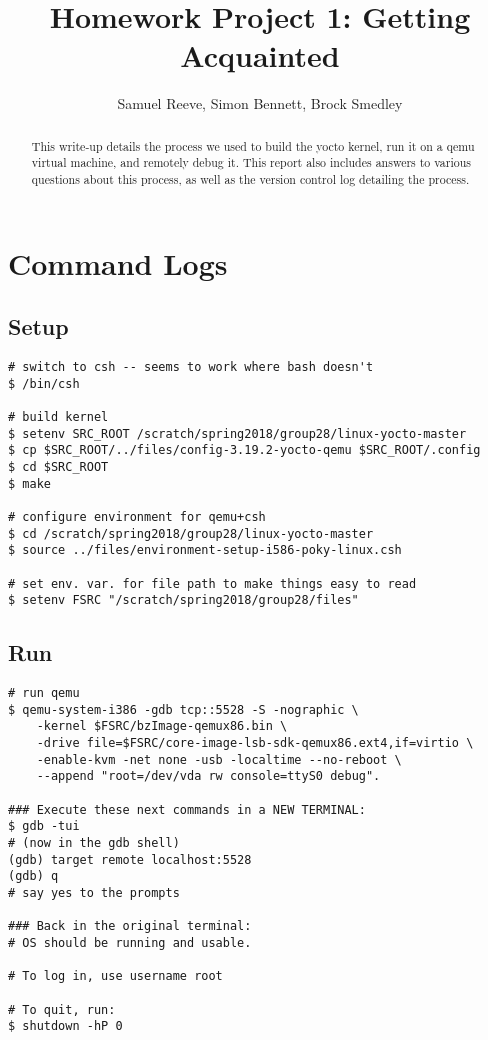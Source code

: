 \documentclass[10pt,a4paper]{report}
\author{Samuel Reeve, Simon Bennett, Brock Smedley}
\title{Homework Project 1: Getting Acquainted}
\begin{document}
	\maketitle
	
	\begin{abstract}
		This write-up details the process we used to build the yocto kernel, run it on a qemu virtual machine, and remotely debug it. This report also includes answers to various questions about this process, as well as the version control log detailing the process.
	\end{abstract}

	\section*{Command Logs}
	\subsection*{Setup}
	\begin{lstlisting}
# switch to csh -- seems to work where bash doesn't
$ /bin/csh

# build kernel
$ setenv SRC_ROOT /scratch/spring2018/group28/linux-yocto-master
$ cp $SRC_ROOT/../files/config-3.19.2-yocto-qemu $SRC_ROOT/.config
$ cd $SRC_ROOT
$ make

# configure environment for qemu+csh
$ cd /scratch/spring2018/group28/linux-yocto-master
$ source ../files/environment-setup-i586-poky-linux.csh

# set env. var. for file path to make things easy to read
$ setenv FSRC "/scratch/spring2018/group28/files"		
	\end{lstlisting}
	
	\subsection*{Run}
	\begin{lstlisting}
# run qemu
$ qemu-system-i386 -gdb tcp::5528 -S -nographic \ 
	-kernel $FSRC/bzImage-qemux86.bin \ 
	-drive file=$FSRC/core-image-lsb-sdk-qemux86.ext4,if=virtio \ 
	-enable-kvm -net none -usb -localtime --no-reboot \ 
	--append "root=/dev/vda rw console=ttyS0 debug".

### Execute these next commands in a NEW TERMINAL:
$ gdb -tui
# (now in the gdb shell)
(gdb) target remote localhost:5528
(gdb) q
# say yes to the prompts

### Back in the original terminal:
# OS should be running and usable. 

# To log in, use username root

# To quit, run:
$ shutdown -hP 0
	\end{lstlisting}
	
\end{document}
